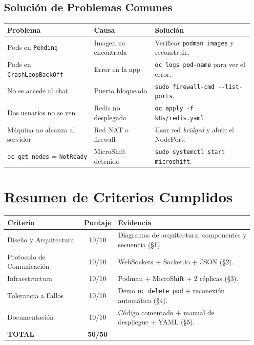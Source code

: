 \documentclass[11pt,a4paper]{article}
\begin{document}
\subsection{Solución de Problemas Comunes}
\renewcommand{\arraystretch}{1.35}
\begin{tabularx}{\linewidth}{l X X}
\toprule
\bfseries Problema & \bfseries Causa & \bfseries Solución \\
\midrule
Pods en \texttt{Pending} & Imagen no encontrada & Verificar \texttt{podman images} y reconstruir. \\
Pods en \texttt{CrashLoopBackOff} & Error en la app & \texttt{oc logs pod-name} para ver el error. \\
No se accede al chat & Puerto bloqueado & \texttt{sudo firewall-cmd -{}-list-ports}. \\
Dos usuarios no se ven & Redis no desplegado & \texttt{oc apply -f k8s/redis.yaml}. \\
Máquina no alcanza al servidor & Red NAT o firewall & Usar red \emph{bridged} y abrir el NodePort. \\
\texttt{oc get nodes} = \texttt{NotReady} & MicroShift detenido & \texttt{sudo systemctl start microshift}. \\
\bottomrule
\end{tabularx}

\section*{Resumen de Criterios Cumplidos}
\renewcommand{\arraystretch}{1.35}
\begin{tabularx}{\linewidth}{X c X}
\toprule
\bfseries Criterio & \bfseries Puntaje & \bfseries Evidencia \\
\midrule
Diseño y Arquitectura & 10/10 & Diagramas de arquitectura, componentes y secuencia (§1). \\
Protocolo de Comunicación & 10/10 & WebSockets + Socket.io + JSON (§2). \\
Infraestructura & 10/10 & Podman + MicroShift + 2 réplicas (§3). \\
Tolerancia a Fallos & 10/10 & Demo \texttt{oc delete pod} + reconexión automática (§4). \\
Documentación & 10/10 & Código comentado + manual de despliegue + YAML (§5). \\
\midrule
\textbf{TOTAL} & \textbf{50/50} & \\
\bottomrule
\end{tabularx}
\end{document}

